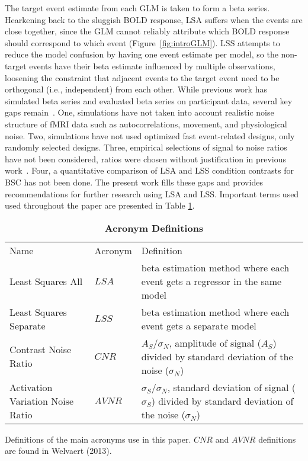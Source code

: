 \documentclass[phd,appendix,figures]{uithesis}
\begin{document}
The target event estimate from each GLM is taken to form a beta series.
Hearkening back to the sluggish BOLD response, LSA suffers when the events are close together,
since the GLM cannot reliably attribute which BOLD response should correspond to which event (Figure~\ref{fig:introGLM}).
LSS attempts to reduce the model confusion by having one event estimate per model,
so the non-target events have their beta estimate influenced by multiple observations, loosening the
constraint that adjacent events to the target event need to be orthogonal (i.e., independent) from each other.
While previous work has simulated beta series and evaluated beta series on participant data,
several key gaps remain~\cite{Mumford2014a,Mumford2012,Turner2012a,Abdulrahman2016,Cisler2012,Arco2018}.
One, simulations have not taken into account realistic noise structure of fMRI data such as autocorrelations, movement, and physiological noise.
Two, simulations have not used optimized fast event-related designs, only randomly selected designs. 
Three, empirical selections of signal to noise ratios have not been considered,
ratios were chosen without justification in previous work~\cite{Abdulrahman2016,Mumford2012}.
Four, a quantitative comparison of LSA and LSS condition contrasts for BSC has not been done.
The present work fills these gaps and provides recommendations for further research
using LSA and LSS.
Important terms used used throughout the paper are presented in Table \ref{table0}.

\begin{table}[H]
  \centering
  \caption{
  {\bf Acronym Definitions}}
  \begin{tabular}{|l|l|p{60mm}|}
  \hline
  Name & Acronym & Definition\\
  Least Squares All & $LSA$ & beta estimation method where each event gets a regressor in the same model\\ \hline
  Least Squares Separate & $LSS$ & beta estimation method where each event gets a separate model\\ \hline
  Contrast Noise Ratio & $CNR$ & $A_S/\sigma_N$, amplitude of signal ($A_S$) divided by standard deviation of the noise ($\sigma_N$)\\ \hline
  Activation Variation Noise Ratio & $AVNR$ & $\sigma_S/\sigma_N$, standard deviation of signal ($\sigma_S$) divided by standard deviation of the noise ($\sigma_N$)\\ \hline
  \end{tabular}

  Definitions of the main acronyms use in this paper.
  $CNR$ and $AVNR$ definitions are found in Welvaert (2013)\cite{Welvaert2013a}.
  \label{table0}
\end{table}
\end{document}
